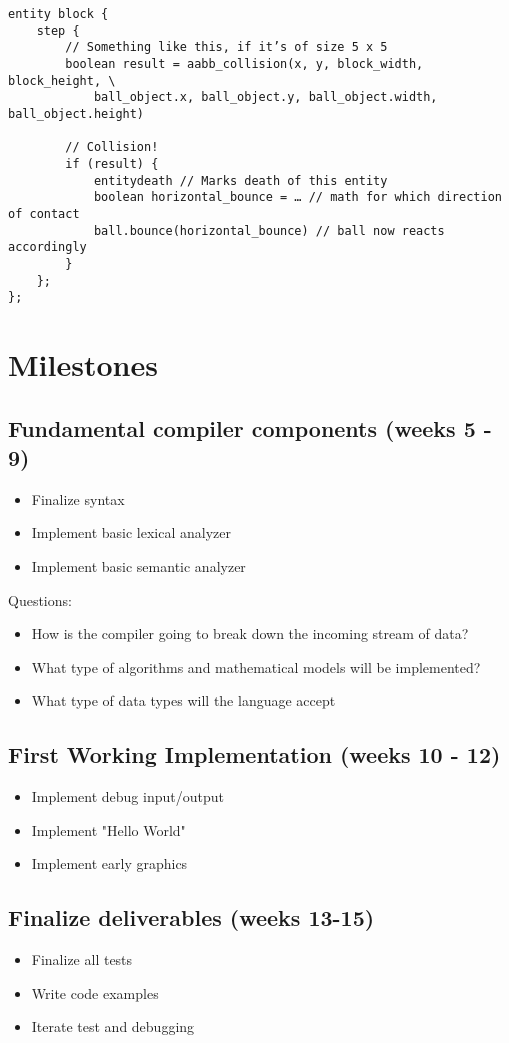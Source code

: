 \documentclass{scrartcl}
\begin{document}
\begin{verbatim}
entity block {
    step {
        // Something like this, if it’s of size 5 x 5 
        boolean result = aabb_collision(x, y, block_width, block_height, \
            ball_object.x, ball_object.y, ball_object.width, ball_object.height)

        // Collision!
        if (result) {
            entitydeath // Marks death of this entity
            boolean horizontal_bounce = … // math for which direction of contact
            ball.bounce(horizontal_bounce) // ball now reacts accordingly
        }
    };
};
\end{verbatim}

\section{Milestones}

\subsection*{Fundamental compiler components (weeks 5 - 9)}
\begin{itemize}
\item Finalize syntax
\item Implement basic lexical analyzer
\item Implement basic semantic analyzer
\end{itemize}
Questions:
\begin{itemize}
\item How is the compiler going to break down the incoming stream of data?
\item What type of algorithms and mathematical models will be implemented?
\item What type of data types will the language accept
\end{itemize}

\subsection*{First Working Implementation (weeks 10 - 12)}
\begin{itemize}
\item Implement debug input/output
\item Implement "Hello World"
\item Implement early graphics
\end{itemize}

\subsection*{Finalize deliverables (weeks 13-15)}
\begin{itemize}
\item Finalize all tests
\item Write code examples
\item Iterate test and debugging
\end{itemize}
\end{document}

